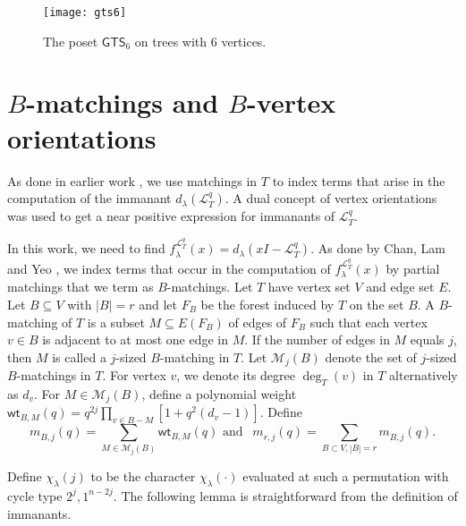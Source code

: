 \documentclass[12pt]{article}
\newcommand{\sL}{  \mathcal{ L}}
\newcommand{\sM}{  \mathcal{ M}}
\newcommand{\GTS}{\mathsf{GTS}}
\newcommand{\wt}{\mathsf{wt}}
\begin{document}
\begin{figure}[h]
\centerline{\texttt{[image: gts6]}}
\caption{The poset $\GTS_6$ on trees with 6 vertices.}
\label{fig:gts6} 
\end{figure}


\section{$B$-matchings and $B$-vertex orientations}
\label{sec:Bmatchings}
As done in earlier work \cite{mukesh-siva-hook}, we use matchings in $T$ to index
terms that arise in the computation of the immanant $d_{\lambda}(\sL_T^q)$.
A dual concept of vertex orientations was used to get a near positive expression
for immanants of $\sL_T^q$.

In this work, we need to find $f_{\lambda}^{\sL_T^q}(x) = d_{\lambda}(xI - \sL_T^q)$.  
As done by Chan, Lam and Yeo \cite{chan_lam_yeo}, we 
index terms that occur in the computation of $f_{\lambda}^{\sL_T^q}(x)$ by 
partial matchings that we term as $B$-matchings.   
Let $T$ have vertex set $V$ and edge set $E$.  Let $B \subseteq V$ with 
$|B| = r$ and let $F_B$ be the forest induced by $T$ on the set $B$.  
A $B$-matching of $T$ is a subset $M \subseteq E(F_B)$ of 
edges of $F_B$ such that each vertex $v \in B$ is adjacent to at most one edge in $M$.  
If the number of edges in $M$ equals $j$, then $M$ is called a $j$-sized
$B$-matching in $T$.  Let $\sM_j(B)$ denote the set of $j$-sized $B$-matchings in $T$.  
For vertex $v$, we  denote its degree $\deg_{T}(v)$ in $T$  
alternatively as $d_v$.  For $M \in \sM_j(B)$, define a polynomial 
weight $\wt_{B,M}(q) =q^{2j} \displaystyle \prod_{v \in B-M} [1+q^2(d_v-1)]$. 
Define 
\begin{equation*}
m_{B,j}^{}(q) = \displaystyle \sum_{M \in \sM_j(B)} \wt_{B,M}(q)
\mbox{  and  } \ \ m_{r,j}^{}(q) =\displaystyle \sum_{B \subset V, |B|=r} m_{B,j}^{}(q).
\end{equation*} 




Define $\chi_{\lambda}^{}(j)$ to be the character 
$\chi_{\lambda}^{}( \cdot )$ evaluated at such a permutation
with cycle type $2^j, 1^{n-2j}$.  The following lemma is 
straightforward from the definition of immanants.
\end{document}
